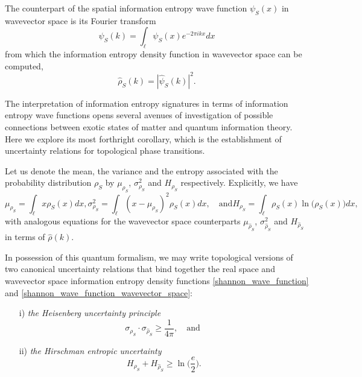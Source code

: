 \documentclass[10pt]{revtex4-1}
\begin{document}
The counterpart of the spatial information entropy wave function $\psi_S(x)$ in wavevector space is its Fourier transform 
\begin{equation}
\label{fourier_shannon_wave_function}
\hat{\psi}_S(k) = \int_{\ell}\psi_S(x)e^{-2\pi ikx}dx
\end{equation}
from which the information entropy density function in wavevector space can be computed,
\begin{equation}
\label{shannon_wave_function_wavevector_space}
\hat{\rho}_S(k) = |\hat{\psi}_S(k)|^2.
\end{equation}

The interpretation of information entropy signatures in terms of information entropy wave functions opens several avenues of investigation of possible connections between exotic states of matter and quantum information theory.  Here we explore its most forthright corollary, which is the establishment of uncertainty relations for topological phase transitions. 

Let us denote the mean, the variance and the entropy associated with the probability distribution $\rho_S$ by $\mu_{\rho_S}$, $\sigma_{\rho_S}^2 $ and $H_{\rho_S}$ respectively. Explicitly, we have 
\begin{subequations}
\label{statistics}
\begin{equation}
\label{mean}
\mu_{\rho_S} = \int_{\ell}x\rho_S(x)dx,
\end{equation}
\begin{equation}
\label{variance}
\sigma_{\rho_S}^2 = \int_{\ell}(x-\mu_{\rho_S})^2\rho_S(x)dx,\quad \text{and}
\end{equation}
\begin{equation}
\label{entropy}
H_{\rho_S} = \int_{\ell}\rho_S(x)\ln\big(\rho_S(x)\big) dx,
\end{equation}
\end{subequations}
with analogous equations for the wavevector space counterparts $\mu_{\hat{\rho}_S}$, $\sigma_{\hat{\rho}_S}^2 $ and $H_{\hat{\rho}_S}$ in terms of $\hat{\rho}(k)$.

In possession of this quantum formalism, we may write topological versions of two canonical uncertainty relations that bind together the real space and wavevector space information entropy density functions \eqref{shannon_wave_function} and \eqref{shannon_wave_function_wavevector_space}: 

\begin{enumerate}
\item[i)] \emph{the Heisenberg uncertainty principle}
\begin{equation}
\label{heisenberg}
\sigma_{\rho_S} \cdot \sigma_{\hat{\rho}_S} \geq \frac{1}{4\pi}, \quad \text{and }
\end{equation}
\item[ii)] \emph{the Hirschman entropic uncertainty}
\begin{equation}
\label{hirschman}
H_{\rho_S} + H_{\hat{\rho}_S} \geq \ln\Big(\frac{e}{2}\Big). 
\end{equation}
\end{enumerate}
\end{document}

